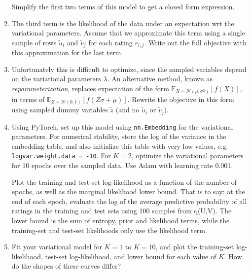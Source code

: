 \documentclass[submit]{harvardml}
\theoremstyle{plain}
\begin{document}
\begin{problem}
\begin{enumerate}
Simplify the first two terms of this model to get a closed form expression.


\item The third term is the likelihood of the data under an expectation wrt the variational parameters.
  Assume that we approximate this term using a single sample of rows $\tilde{u}_{i}$  and $\tilde{v}_{j}$
  for each rating $r_{i,j}$. Write out the full objective with this approximation for the last term.

\item  Unfortunately this is difficult to optimize, since the sampled variables 
depend on the variational parameters $\lambda$. An alternative method, known as 
\textit{reparameterization}, replaces expectation of the form 
$\mathbb{E}_{X \sim \mathcal{N}(\mu, \sigma^2)}[f(X)]$, in terms of 
$\mathbb{E}_{Z \sim \mathcal{N}(0, 1)}[f(Z \sigma + \mu)]$. Rewrite the 
objective in this form using sampled dummy variables $\tilde{z}$ 
(and no $\tilde{u}_{i}$  or $\tilde{v}_{j})$.

\item Using PyTorch, set up this model using \texttt{nn.Embedding} for the variational parameters. For numerical stability, store the log of the variance in
  the embedding table, and also initialize this table with very low values, e.g. \texttt{logvar.weight.data = -10}. 
  For $K = 2$, optimize the variational parameters for 10 epochs over the sampled data.  Use Adam with learning rate 0.001.

Plot the training and test-set log-likelihood as a function of the number of epochs, as well as the marginal likelihood lower bound.
That is to say: at the end of each epoch, evaluate the log of the average predictive probability of all ratings in the training and test sets using 100 samples from q(U,V).
The lower bound is the sum of entropy, prior and likelihood terms, while the training-set and test-set likelihoods only use the likelihood term.

\item Fit your variational model for $K = 1$ to $K = 10$, and plot the training-set log-likelihood, test-set log-likelihood, and lower bound for each value of $K$.
How do the shapes of these curves differ?



\end{enumerate}
\end{problem}
\end{document}
